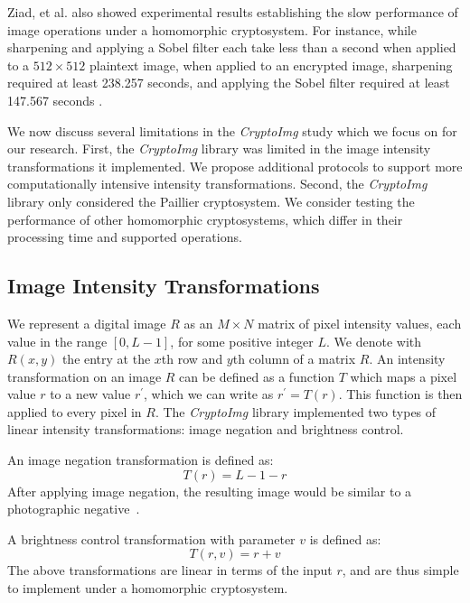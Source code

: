 Ziad, et al. also showed experimental results establishing the slow performance of image operations under a homomorphic cryptosystem. For instance, while sharpening and applying a Sobel filter each take less than a second when applied to a $512\times 512$ plaintext image, when applied to an encrypted image, sharpening required at least 238.257 seconds, and applying the Sobel filter required at least 147.567 seconds \cite{ziad_cryptoimg:_2016}.

We now discuss several limitations in the \textit{CryptoImg} study which we focus on for our research. First, the \textit{CryptoImg} library was limited in the image intensity transformations it implemented. We propose additional protocols to support more computationally intensive intensity transformations.
Second, the \textit{CryptoImg} library only considered the Paillier cryptosystem. We consider testing the performance of other homomorphic cryptosystems, which differ in their processing time and supported operations.

\subsection{Image Intensity Transformations}
We represent a digital image $R$ as an $M \times N$ matrix of pixel intensity values, each value in the range $\left[0, L-1\right]$, for some positive integer $L$. We denote with $R(x,y)$ the entry at the $x$th row and $y$th column of a matrix $R$.
An intensity transformation on an image $R$ can be defined as a function $T$ which maps a pixel value $r$ to a new value $r^\prime$, which we can write as $r^\prime = T\left(r\right)$. This function is then applied to every pixel in $R$.
The \textit{CryptoImg} library implemented two types of linear intensity transformations: image negation and brightness control.

An image negation transformation is defined as:
\begin{equation}
    T\left(r\right) = L-1-r
\end{equation}
After applying image negation, the resulting image would be similar to a photographic negative~\cite{gonzalez_digital_2008}.

A brightness control transformation with parameter $v$ is defined as:
\begin{equation}
    T\left(r,v\right) = r+v
\end{equation}
The above transformations are linear in terms of the input $r$, and are thus simple to implement under a homomorphic cryptosystem.


